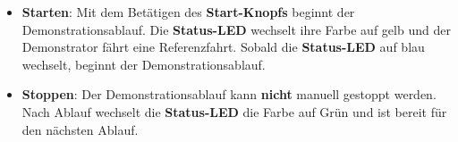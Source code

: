 \begin{itemize}
	
	\item \textbf{Starten}: Mit dem Betätigen des \textbf{Start-Knopfs} beginnt der Demonstrationsablauf. Die \textbf{Status-LED} wechselt ihre Farbe auf gelb und der Demonstrator fährt eine Referenzfahrt. Sobald die \textbf{Status-LED} auf blau wechselt, beginnt der Demonstrationsablauf.
	
	\item \textbf{Stoppen}: Der Demonstrationsablauf kann \textbf{nicht} manuell gestoppt werden. Nach Ablauf wechselt die \textbf{Status-LED} die Farbe auf Grün und ist bereit für den nächsten Ablauf.
\end{itemize}